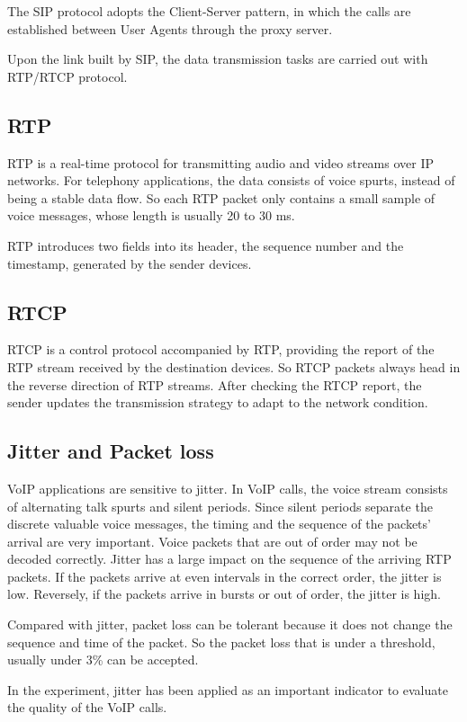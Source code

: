 The SIP protocol adopts the Client-Server pattern, in which the calls are established between User Agents through the proxy server.

Upon the link built by SIP, the data transmission tasks are carried out with RTP/RTCP protocol.

\subsection{RTP}
RTP is a real-time protocol for transmitting audio and video streams over IP networks. For telephony applications, the data consists of voice spurts, instead of being a stable data flow. So each RTP packet only contains a small sample of voice messages, whose length is usually 20 to 30 ms.

RTP introduces two fields into its header, the sequence number and the timestamp, generated by the sender devices.

\subsection{RTCP}
RTCP is a control protocol accompanied by RTP, providing the report of the RTP stream received by the destination devices. So RTCP packets always head in the reverse direction of RTP streams. After checking the RTCP report, the sender updates the transmission strategy to adapt to the network condition.

\subsection{Jitter and Packet loss}
VoIP applications are sensitive to jitter. In VoIP calls, the voice stream consists of alternating talk spurts and silent periods. Since silent periods separate the discrete valuable voice messages, the timing and the sequence of the packets' arrival are very important. Voice packets that are out of order may not be decoded correctly. Jitter has a large impact on the sequence of the arriving RTP packets. If the packets arrive at even intervals in the correct order, the jitter is low. Reversely, if the packets arrive in bursts or out of order, the jitter is high.

Compared with jitter, packet loss can be tolerant because it does not change the sequence and time of the packet. So the packet loss that is under a threshold, usually under 3\% can be accepted.

In the experiment, jitter has been applied as an important indicator to evaluate the quality of the VoIP calls.


